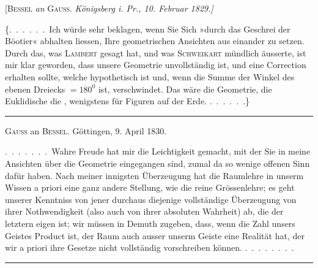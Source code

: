 \begin{center}
[\textsc{Bessel} \emph{an} \textsc{Gauss}. \emph{Königsberg i. Pr., 10. Februar 1829.]}
\end{center}

\{.\ .\ .\ .\ .\ .\ Ich würde sehr beklagen, wenn Sie Sich »durch das Geschrei der
Böotier« abhalten liessen, Ihre geometrischen Ansichten aus einander zu setzen.
Durch das, was \textsc{Lambert} gesagt hat, und was \textsc{Schweikart} mündlich äusserte,
ist mir klar geworden, dass unsere Geometrie unvollständig ist, und eine Correction erhalten sollte, welche hypothetisch ist und, wenn die Summe der
Winkel des ebenen Dreiecks $=180^{0}$ ist, verschwindet. Das wäre die 
Geometrie, die Euklidische die , wenigstens für Figuren auf der
Erde. .\ .\ .\ .\ .\ .\}

\rule{4cm}{0.5pt}

\begin{center}
\textsc{Gauss} an \textsc{Bessel}. Göttingen, 9. April 1830.
\end{center}

.\ .\ .\ .\ .\ .\ .\ Wahre Freude hat mir die Leichtigkeit gemacht, mit der Sie
in meine Ansichten über die Geometrie eingegangen sind, zumal da so wenige
offenen Sinn dafür haben. Nach meiner innigsten Überzeugung hat die Raumlehre in unserm Wissen a priori eine ganz andere Stellung, wie die reine
Grössenlehre; es geht unserer Kenntniss von jener durchaus diejenige vollständige Überzeugung von ihrer Nothwendigkeit (also auch von ihrer absoluten
Wahrheit) ab, die der letztern eigen ist; wir müssen in Demuth zugeben,
dass, wenn die Zahl  unsers Geistes Product ist, der Raum auch ausser
unserm Geiste eine Realität hat, der wir a priori ihre Gesetze nicht vollständig vorschreiben können. .\ .\ .\ .\ .\ .\ .\ .

\rule{4cm}{0.5pt}


